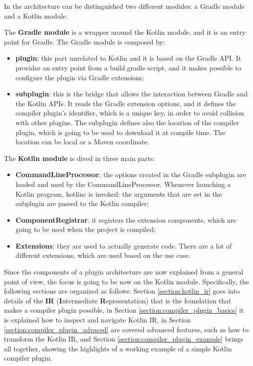 In the architecture can be distinguished two different modules: a Gradle module and a Kotlin module.

The \textbf{Gradle module} is a wrapper around the Kotlin module, and it is an entry point for Gradle. The Gradle module is composed by:
\begin{itemize}
    \item \textbf{plugin}: this part unrelated to Kotlin and it is based on the Gradle API. It provides an entry point from a build.gradle script, and it makes possible to configure the plugin via Gradle extensions;
    \item \textbf{subplugin}: this is the bridge that allows the interaction between Gradle and the Kotlin APIs. It reads the Gradle extension options, and it defines the compiler plugin's identifier, which is a unique key, in order to avoid collision with other plugins. The subplugin defines also the location of the compiler plugin, which is going to be used to download it at compile time. The location can be local or a Maven coordinate.
\end{itemize}

The \textbf{Kotlin module} is dived in three main parts:
\begin{itemize}
    \item \textbf{CommandLineProcessor}: the options created in the Gradle subplugin are loaded and used by the CommandLineProcessor. Whenever launching a Kotlin program, kotlinc is invoked: the arguments that are set in the subplugin are passed to the Kotlin compiler;
    \item \textbf{ComponentRegistrar}: it registers the extension components, which are going to be used when the project is compiled;
    \item \textbf{Extensions}: they are used to actually generate code. There are a lot of different extensions, which are used based on the use case.
\end{itemize}

Since the components of a plugin architecture are now explained from a general point of view, the focus is going to be now on the Kotlin module.
Specifically, the following sections are organized as follows: Section \ref{section:kotlin_ir} goes into details of the \textbf{IR} (\textbf{I}ntermediate \textbf{R}epresentation) that is the foundation that makes a compiler plugin possible, in Section \ref{section:compiler_plugin_basics} it is explained how to inspect and navigate Kotlin IR, in Section \ref{section:compiler_plugin_advaced} are covered advanced features, such as how to transform the Kotlin IR, and Section \ref{section:compiler_plugin_example} brings all together, showing the highlights of a working example of a simple Kotlin compiler plugin.

